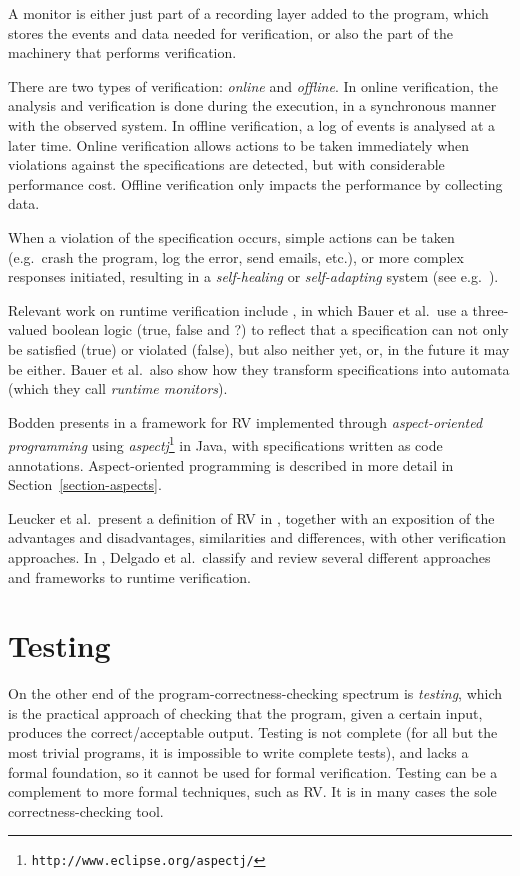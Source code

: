 \documentclass[a4paper,11pt]{kth-mag}
\begin{document}
A monitor is either just part of a recording layer added to the program, which
stores the events and data needed for verification, or also the part of the
machinery that performs verification.

There are two types of verification: \emph{online} and \emph{offline}. In
online verification, the analysis and verification is done during the
execution, in a synchronous manner with the observed system. In offline
verification, a log of events is analysed at a later time. Online verification
allows actions to be taken immediately when violations against the
specifications are detected, but with considerable performance cost. Offline
verification only impacts the performance by collecting data.

When a violation of the specification occurs, simple actions can be taken
(e.g.\ crash the program, log the error, send emails, etc.), or more complex
responses initiated, resulting in a \textit{self-healing} or
\textit{self-adapting} system (see e.g.\ \cite{huebscher08survey}).

Relevant work on runtime verification include \cite{bauer06monitoring}, in
which Bauer et al.\ use a three-valued boolean logic (true, false and ?) to
reflect that a specification can not only be satisfied (true) or violated
(false), but also neither yet, or, in the future it may be either. Bauer et
al.\ also show how they transform specifications into automata (which they call
\textit{runtime monitors}).

Bodden presents in \cite{bodden05efficientrv} a framework for RV implemented
through \emph{aspect-oriented programming} using
\textit{aspectj}\footnote{\texttt{http://www.eclipse.org/aspectj/}} in Java,
with specifications written as code annotations. Aspect-oriented programming is
described in more detail in Section~\ref{section-aspects}.

Leucker et al.\ present a definition of RV in \cite{leucker09abriefaccount},
together with an exposition of the advantages and disadvantages, similarities
and differences, with other verification approaches. In
\cite{delgado04taxonomy}, Delgado et al.\ classify and review several different
approaches and frameworks to runtime verification.


\section{Testing} \label{section-testing}
On the other end of the program-correctness-checking spectrum is
\emph{testing}, which is the practical approach of checking that the program,
given a certain input, produces the correct/acceptable output. Testing is not
complete (for all but the most trivial programs, it is impossible to write
complete tests), and lacks a formal foundation, so it cannot be used for formal
verification. Testing can be a complement to more formal techniques, such as
RV. It is in many cases the sole correctness-checking tool.
\end{document}
